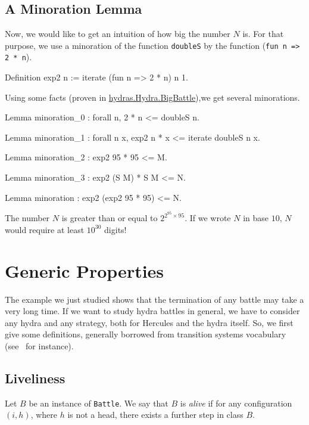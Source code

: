 \subsection{A Minoration Lemma}

Now, we would like to get an intuition of  how big the number $N$ is.
For that purpose, we use a minoration of the function \texttt{doubleS} by the
function (\texttt{fun n => 2 * n}).

\begin{Coqsrc}
Definition exp2 n := iterate (fun n => 2 * n) n 1.
\end{Coqsrc}
Using some facts (proven in 
\href{../theories/html/hydras.Hydra.BigBattle.html}{hydras.Hydra.BigBattle}),we get several  minorations.

\begin{Coqsrc}
Lemma minoration_0 : forall n,  2 * n <= doubleS n.

Lemma minoration_1 : forall n x, exp2 n * x <= iterate doubleS n x.

Lemma minoration_2 : exp2 95 * 95 <= M.

Lemma minoration_3 : exp2 (S M) * S M <= N.

Lemma minoration : exp2 (exp2 95 * 95) <= N.
\end{Coqsrc}


The number $N$ is greater than or  equal to $2^{2^{95}\times 95}.$ If we wrote $N$ in base $10$, $N$ would require at least $10^{30}$ digits!


\section{Generic Properties}


The example we just studied shows that the termination of any battle may take a very long time. If we want to study hydra battles in general, we have to consider 
any hydra and any strategy, both for Hercules and the hydra itself. So, we first  give some definitions, generally borrowed from transition systems vocabulary (see~\cite{tel_2000} for instance).


\subsection{Liveliness}


Let $B$ be an instance of \texttt{Battle}. We say that $B$ is \emph{alive} if
for any configuration $(i,h)$, where $h$ is not a head, there exists a further step in class $B$.



